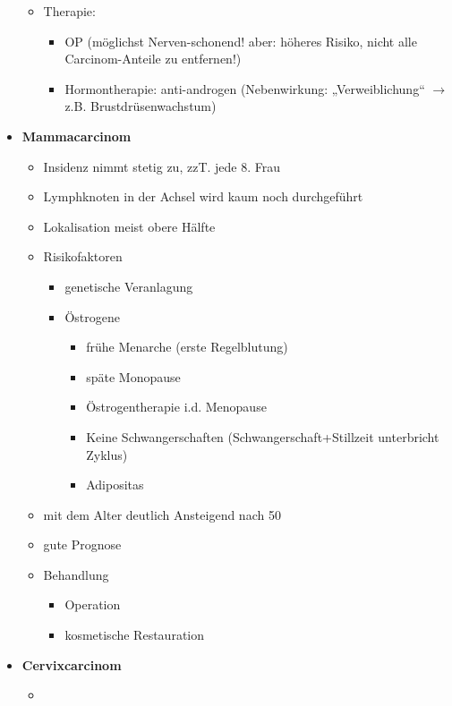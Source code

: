 \begin{itemize}
\begin{itemize}
					\item Therapie:
						\begin{itemize}
							\item OP (möglichst Nerven-schonend! aber: höheres Risiko, nicht alle Carcinom-Anteile zu entfernen!)
							\item Hormontherapie: anti-androgen (Nebenwirkung: „Verweiblichung“ $\rightarrow$ z.B. Brustdrüsenwachstum)
						\end{itemize}
				\end{itemize}
			\pagebreak
			\item \textbf{Mammacarcinom}
				\begin{itemize}
					\item Insidenz nimmt stetig zu, zzT. jede 8. Frau
					\item Lymphknoten in der Achsel wird kaum noch durchgeführt
					\item Lokalisation meist obere Hälfte
					\item Risikofaktoren
						\begin{itemize}
							\item genetische Veranlagung
							\item Östrogene
								\begin{itemize}
									\item frühe Menarche (erste Regelblutung)
									\item späte Monopause
									\item Östrogentherapie i.d. Menopause
									\item Keine Schwangerschaften (Schwangerschaft+Stillzeit unterbricht Zyklus)
									\item Adipositas
								\end{itemize}
						\end{itemize}
					\item mit dem Alter deutlich Ansteigend nach 50
					\item gute Prognose
					\item Behandlung
						\begin{itemize}
							\item Operation
							\item kosmetische Restauration
						\end{itemize}
				\end{itemize}
			\item \textbf{Cervixcarcinom}
				\begin{itemize}
					\item 
				\end{itemize}

\end{itemize}
